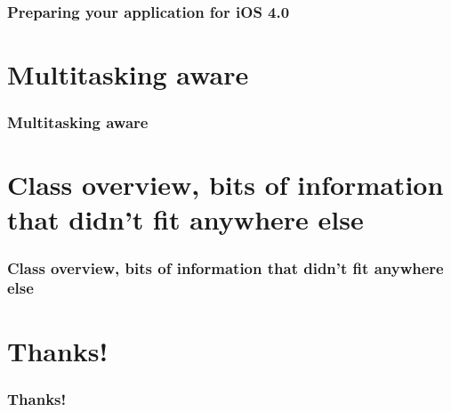 \documentclass[10pt]{beamer}
\begin{document}
    
\begin{frame}[fragile]
  \frametitle{Preparing your application for iOS 4.0}
  
\end{frame}

    

   
  

  
\section{Multitasking aware}
\begin{frame}[fragile]
  \frametitle{Multitasking aware}
  
\end{frame}


  

  
\section{Class overview, bits of information that didn't fit anywhere else}
\begin{frame}[fragile]
  \frametitle{Class overview, bits of information that didn't fit anywhere else}
  
\end{frame}


  

  
\section{Thanks!}
\begin{frame}[fragile]
  \frametitle{Thanks!}
  
\end{frame}


  


{}

\end{document}
